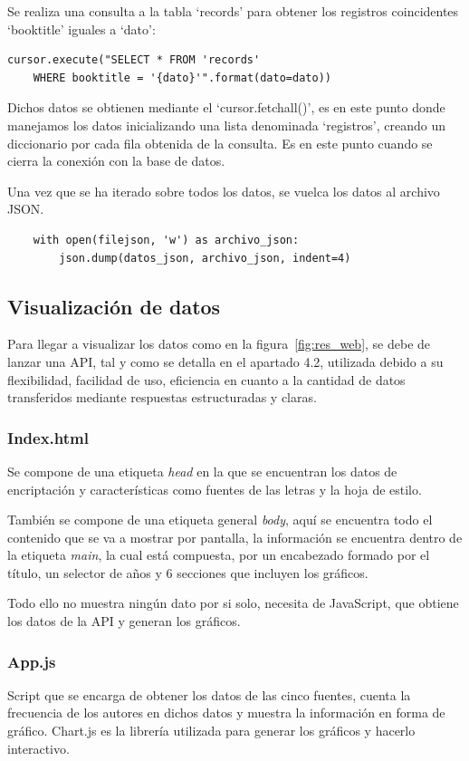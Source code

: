 \documentclass[a4paper, 12pt]{book}
\begin{document}
Se realiza una consulta a la tabla `records' para obtener los registros coincidentes `booktitle' iguales a `dato':

\begin{verbatim}
cursor.execute("SELECT * FROM 'records' 
    WHERE booktitle = '{dato}'".format(dato=dato))
\end{verbatim}

Dichos datos se obtienen mediante el `cursor.fetchall()', es en este punto donde manejamos los datos inicializando una lista denominada `registros', creando un diccionario por cada fila obtenida de la consulta. Es en este punto cuando se cierra la conexión con la base de datos.

Una vez que se ha iterado sobre todos los datos, se vuelca los datos al archivo JSON.

\begin{verbatim}
    with open(filejson, 'w') as archivo_json:
        json.dump(datos_json, archivo_json, indent=4)
\end{verbatim}

\subsection{Visualización de datos}

Para llegar a visualizar los datos como en la figura~\ref{fig:res_web}, se debe de lanzar una API, tal y como se detalla en el apartado 4.2, utilizada debido a su flexibilidad, facilidad de uso, eficiencia en cuanto a la cantidad de datos transferidos mediante respuestas estructuradas y claras.

\subsubsection{Index.html}
Se compone de una etiqueta \textit{head} en la que se encuentran los datos de encriptación y características como fuentes de las letras y la hoja de estilo.

También se compone de una etiqueta general \textit{body}, aquí se encuentra todo el contenido que se va a mostrar por pantalla, la información se encuentra dentro de la etiqueta \textit{main}, la cual está compuesta, por un encabezado formado por el título, un selector de años y 6 secciones que incluyen los gráficos.

Todo ello no muestra ningún dato por si solo, necesita de JavaScript, que obtiene los datos de la API y generan los gráficos.

\subsubsection{App.js}
Script que se encarga de obtener los datos de las cinco fuentes, cuenta la frecuencia de los autores en dichos datos y muestra la información en forma de gráfico. Chart.js es la librería utilizada para generar los gráficos y hacerlo interactivo. 
\end{document}
